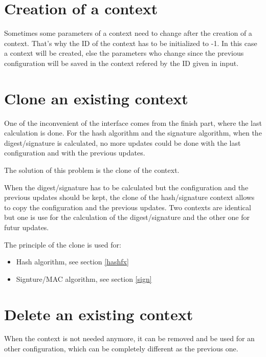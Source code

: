 \section{Creation of a context}
Sometimes some parameters of a context need to change after the creation of a
context. That's why the ID of the context has to be initialized to -1. In this
case a context will be created, else the parameters who change since the
previous configuration will be saved in the context refered by the ID given
in input.


\section{Clone an existing context}
\label{ctx_clone}

One of the inconvenient of the interface comes from the finish part, where the
last calculation is done.
For the hash algorithm and the signature algorithm, when the digest/signature is
calculated, no more updates could be done with the last configuration and
with the previous updates.

The solution of this problem is the clone of the context.

When the digest/signature has to be calculated but the configuration and the
previous updates should be kept, the clone of the hash/signature context allows
to copy the configuration and the previous updates. Two contexts are identical
but one is use for the calculation of the digest/signature and the other one for
futur updates.

The principle of the clone is used for:
\begin{itemize}[noitemsep]
  \item Hash algorithm, see section \ref{hashfx}
  \item Signture/MAC algorithm, see section \ref{sign}
\end{itemize}

\section{Delete an existing context}
\label{delCtx}

When the context is not needed anymore, it can be removed and be used for an
other configuration, which can be completely different as the previous one.

